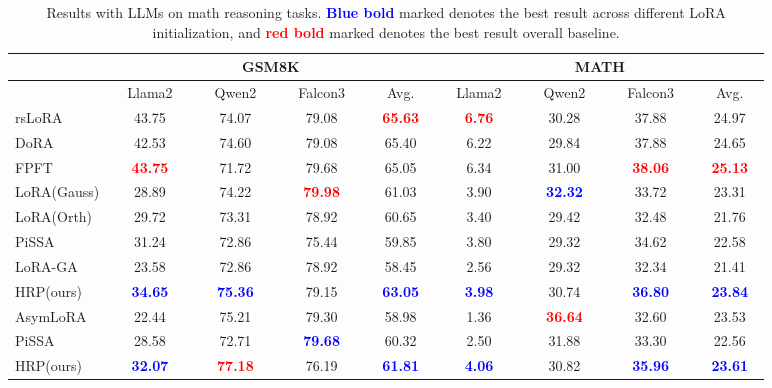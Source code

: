 \begin{table*}
\label{llm}
    \centering
    \caption{Results with LLMs on math reasoning tasks. \textcolor{blue}{\textbf{Blue bold}} marked denotes the best result across different LoRA initialization, and \textcolor{red}{\textbf{red bold}} marked denotes the best result overall baseline.}
\begin{tabular}{l|cccc|cccc}
\hline
 & \multicolumn{4}{c}{GSM8K} & \multicolumn{4}{|c}{MATH} \\\hline
 & ~~Llama2~~ & ~~Qwen2~~ & ~~Falcon3~~ & ~~Avg.~~ & ~~Llama2~~ & ~~Qwen2~~ & ~~Falcon3~~ & ~~Avg.~~ \\\hline
rsLoRA & 43.75 & 74.07 & 79.08 & \textcolor{red}{\textbf{65.63}} & \textcolor{red}{\textbf{6.76}} & 30.28 & 37.88 & 24.97 \\
DoRA & 42.53 & 74.60 & 79.08 & 65.40 & 6.22 & 29.84 & 37.88 & 24.65 \\
FPFT & \textcolor{red}{\textbf{43.75}} & 71.72 & 79.68 & 65.05 & 6.34 & 31.00 & \textcolor{red}{\textbf{38.06}} & \textcolor{red}{\textbf{25.13}} \\\hline
LoRA(Gauss) & 28.89 & 74.22 & \textcolor{red}{\textbf{79.98}} & 61.03 & 3.90 & \textcolor{blue}{\textbf{32.32}} & 33.72 & 23.31 \\
LoRA(Orth) & 29.72 & 73.31 & 78.92 & 60.65 & 3.40 & 29.42 & 32.48 & 21.76 \\
PiSSA & 31.24 & 72.86 & 75.44 & 59.85 & 3.80 & 29.32 & 34.62 & 22.58 \\
LoRA-GA & 23.58 & 72.86 & 78.92 & 58.45 & 2.56 & 29.32 & 32.34 & 21.41 \\
HRP(ours) & \textcolor{blue}{\textbf{34.65}} & \textcolor{blue}{\textbf{75.36}} & 79.15 & \textcolor{blue}{\textbf{63.05}} & \textcolor{blue}{\textbf{3.98}} & 30.74 & \textcolor{blue}{\textbf{36.80}} & \textcolor{blue}{\textbf{23.84}} \\\hline
AsymLoRA & 22.44 & 75.21 & 79.30 & 58.98 & 1.36 & \textcolor{red}{\textbf{36.64}} & 32.60 & 23.53 \\
PiSSA & 28.58 & 72.71 & \textcolor{blue}{\textbf{79.68}} & 60.32 & 2.50 & 31.88 & 33.30 & 22.56 \\
HRP(ours) & \textcolor{blue}{\textbf{32.07}} & \textcolor{red}{\textbf{77.18}} & 76.19 & \textcolor{blue}{\textbf{61.81}} & \textcolor{blue}{\textbf{4.06}} & 30.82 & \textcolor{blue}{\textbf{35.96}} & \textcolor{blue}{\textbf{23.61}} \\
\bottomrule
\end{tabular}
\end{table*}

